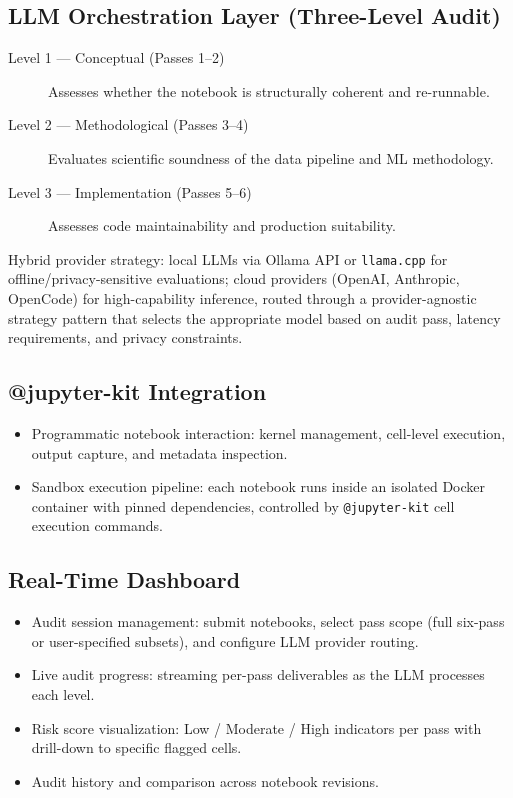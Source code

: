 \documentclass[11pt, a4paper]{article}
\begin{document}
\subsection*{LLM Orchestration Layer (Three-Level Audit)}

\begin{description}
  \item[Level 1 — Conceptual (Passes 1--2)] Assesses whether the notebook is
    structurally coherent and re-runnable.

  \item[Level 2 — Methodological (Passes 3--4)] Evaluates scientific soundness of
    the data pipeline and ML methodology.

  \item[Level 3 — Implementation (Passes 5--6)] Assesses code maintainability and
    production suitability.
\end{description}

\noindent Hybrid provider strategy: local LLMs via Ollama API or \texttt{llama.cpp}
for offline/privacy-sensitive evaluations; cloud providers (OpenAI, Anthropic,
OpenCode) for high-capability inference, routed through a provider-agnostic strategy
pattern that selects the appropriate model based on audit pass, latency requirements,
and privacy constraints.

\subsection*{@jupyter-kit Integration}

\begin{itemize}
  \item Programmatic notebook interaction: kernel management, cell-level execution,
    output capture, and metadata inspection.
  \item Sandbox execution pipeline: each notebook runs inside an isolated Docker
    container with pinned dependencies, controlled by \texttt{@jupyter-kit} cell
    execution commands.
\end{itemize}

\subsection*{Real-Time Dashboard}

\begin{itemize}
  \item Audit session management: submit notebooks, select pass scope (full six-pass
    or user-specified subsets), and configure LLM provider routing.
  \item Live audit progress: streaming per-pass deliverables as the LLM processes
    each level.
  \item Risk score visualization: Low / Moderate / High indicators per pass with
    drill-down to specific flagged cells.
  \item Audit history and comparison across notebook revisions.
\end{itemize}
\end{document}
